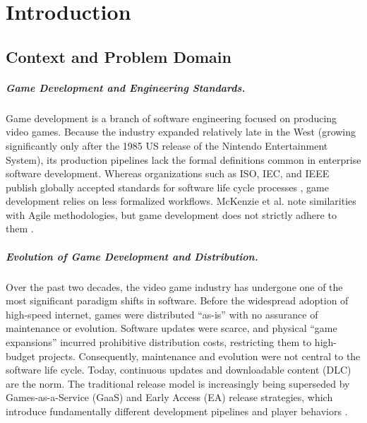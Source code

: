 \chapter{Introduction}

\section{Context and Problem Domain}

\paragraph{Game Development and Engineering Standards.}
Game development is a branch of software engineering focused on producing video games. Because the industry expanded relatively late in the West (growing significantly only after the 1985 US release of the Nintendo Entertainment System), its production pipelines lack the formal definitions common in enterprise software development. Whereas organizations such as ISO, IEC, and IEEE publish globally accepted standards for software life cycle processes \cite{12207-2026}, game development relies on less formalized workflows. McKenzie et al. note similarities with Agile methodologies, but game development does not strictly adhere to them \cite{se_practices_game_dev}.

\paragraph{Evolution of Game Development and Distribution.}
Over the past two decades, the video game industry has undergone one of the most significant paradigm shifts in software. Before the widespread adoption of high-speed internet, games were distributed ``as-is'' with no assurance of maintenance or evolution. Software updates were scarce, and physical ``game expansions'' incurred prohibitive distribution costs, restricting them to high-budget projects. Consequently, maintenance and evolution were not central to the software life cycle. Today, continuous updates and downloadable content (DLC) are the norm. The traditional release model is increasingly being superseded by Games-as-a-Service (GaaS) and Early Access (EA) release strategies, which introduce fundamentally different development pipelines and player behaviors \cite{paradigm_shifts_game_dev, ea_steam}.

